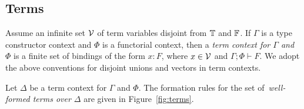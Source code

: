 \documentclass[runningheads]{llncs}
\newcommand{\fold}{\mathsf{fold}}
\begin{document}
\begin{comment}
    \phi.\lambda \ol{\alpha}.H)\ol{\beta}][\ol{\alpha := \beta}]\,(\mu
  \phi.\lambda \ol{\alpha}.H)\ol{\beta}$}
\hspace*{0.2in}\DisplayProof\vspace*{-0.05in}
\\\\
\AXC{$\Gamma; \phi,\ol{\alpha}, \ol{\gamma} \vdash H$}
\AXC{$\Gamma; \ol{\beta}, \ol{\gamma} \vdash F$}
\BIC{$\Gamma; \emptyset  \,|\, \emptyset \vdash \fold^F_H :
  \Nat^\emptyset\; (\Nat^{\ol{\beta}, \ol{\gamma}}\,H[\phi
    :=_{\ol{\beta}} F][\ol{\alpha := \beta}]\,F)\; (\Nat^{\ol{\beta},
    \ol{\gamma}}\,(\mu \phi.\lambda \ol{\alpha}.H)\ol{\beta}\,F)$}
\hspace*{0.2in}\DisplayProof\vspace*{-0.1in}
\end{array}\]
\caption{Well-formed terms}\label{fig:terms} 
\end{minipage}}
\end{figure}
\end{comment}



\vspace*{-0.1in}

\subsection{Terms}\label{sec:terms}
Assume an infinite set $\cal V$ of term variables disjoint from
$\mathbb{T}$ and $\mathbb{F}$. If $\Gamma$ is a type constructor context and
$\Phi$ is a functorial context, then a {\em term context for $\Gamma$
  and $\Phi$} is a finite set of bindings of the form $x : F$, where
$x \in {\cal V}$ and $\Gamma; \Phi \vdash F$. We adopt the above
conventions for disjoint unions and vectors in term contexts.

Let $\Delta$ be a term context for $\Gamma$ and $\Phi$.  The formation
rules for the set of\, {\em well-formed terms over $\Delta$} are given
in Figure~\ref{fig:terms}.
\end{document}
